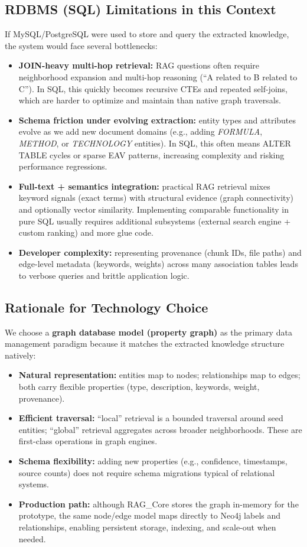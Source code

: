 \subsection{RDBMS (SQL) Limitations in this Context}
If MySQL/PostgreSQL were used to store and query the extracted knowledge, the system would face several bottlenecks:
\begin{itemize}
	\item \textbf{JOIN-heavy multi-hop retrieval:} RAG questions often require neighborhood expansion and multi-hop reasoning (``A related to B related to C''). In SQL, this quickly becomes recursive CTEs and repeated self-joins, which are harder to optimize and maintain than native graph traversals.
	\item \textbf{Schema friction under evolving extraction:} entity types and attributes evolve as we add new document domains (e.g., adding \textit{FORMULA}, \textit{METHOD}, or \textit{TECHNOLOGY} entities). In SQL, this often means ALTER TABLE cycles or sparse EAV patterns, increasing complexity and risking performance regressions.
	\item \textbf{Full-text + semantics integration:} practical RAG retrieval mixes keyword signals (exact terms) with structural evidence (graph connectivity) and optionally vector similarity. Implementing comparable functionality in pure SQL usually requires additional subsystems (external search engine + custom ranking) and more glue code.
	\item \textbf{Developer complexity:} representing provenance (chunk IDs, file paths) and edge-level metadata (keywords, weights) across many association tables leads to verbose queries and brittle application logic.
\end{itemize}

\subsection{Rationale for Technology Choice}
We choose a \textbf{graph database model (property graph)} as the primary data management paradigm because it matches the extracted knowledge structure natively:
\begin{itemize}
	\item \textbf{Natural representation:} entities map to nodes; relationships map to edges; both carry flexible properties (type, description, keywords, weight, provenance).
	\item \textbf{Efficient traversal:} ``local'' retrieval is a bounded traversal around seed entities; ``global'' retrieval aggregates across broader neighborhoods. These are first-class operations in graph engines.
	\item \textbf{Schema flexibility:} adding new properties (e.g., confidence, timestamps, source counts) does not require schema migrations typical of relational systems.
	\item \textbf{Production path:} although RAG\_Core stores the graph in-memory for the prototype, the same node/edge model maps directly to Neo4j labels and relationships, enabling persistent storage, indexing, and scale-out when needed.
\end{itemize}

